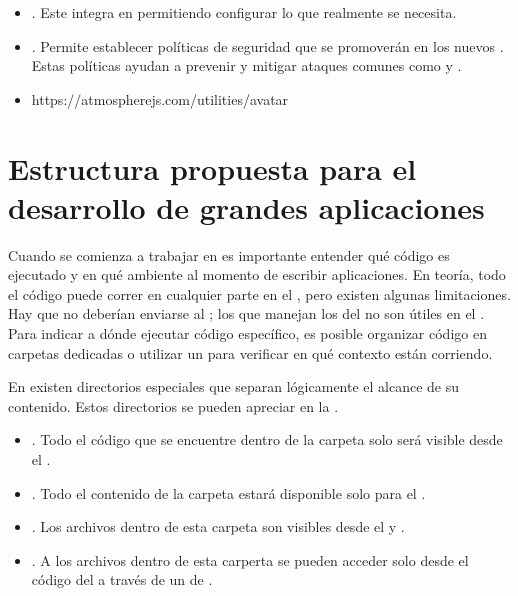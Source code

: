 \begin{itemize}
		\item
			\textbf{\bootstrapPackage}. Este \packageAS integra \bootstrapNAME en \meteorNAME permitiendo configurar lo que realmente se necesita.
		\item
			\textbf{\browserPolicyPackage}. Permite establecer políticas de seguridad que se promoverán en los nuevos \browsersINT. Estas políticas ayudan a prevenir y mitigar ataques comunes como \crossSiteScriptingINT y \clickjackingINT.
		\item
			https://atmospherejs.com/utilities/avatar
	\end{itemize}


\section{Estructura propuesta para el desarrollo de grandes aplicaciones}\label{cap:arquitectura:section:generic_architecture_structure}

Cuando se comienza a trabajar en \meteorNAME es importante entender qué código es ejecutado y en qué ambiente al momento de escribir aplicaciones. En teoría, todo el código puede correr en cualquier parte en el \stackAS, pero existen algunas limitaciones. Hay \apikeyAS que no deberían enviarse al \clientAS; los \events que manejan los \clicksPC del \mousePC no son útiles en el \serverAS. Para indicar a \meteorNAME dónde ejecutar código específico, es posible organizar código en carpetas dedicadas o utilizar un \checkCPT para verificar en qué contexto están corriendo.

En \meteorNAME existen directorios especiales que separan lógicamente el alcance de su contenido. Estos directorios se pueden apreciar en la .


	\begin{itemize}
		\item
			\textbf{\clientFolder}. Todo el código que se encuentre dentro de la carpeta  \clientFolder solo será visible desde el \clientSideAS.
		\item
			\textbf{\serverFolder}.  Todo el contenido de la carpeta \serverFolder estará disponible solo para el \serverSideAS.
		\item
			\textbf{\publicFolder}. Los archivos dentro de esta carpeta son visibles desde el \clientSideAS y \serverSideAS.
		\item
			\textbf{\privateFolder}. A los archivos dentro de esta carperta se pueden acceder solo desde el código del \serverAS a través de un \apiAS de \assetsAS.
	\end{itemize}


